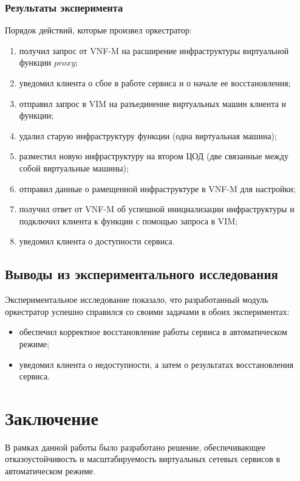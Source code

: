 \documentclass[oneside,final,14pt,a4paper]{extreport}
\begin{document}
\subsection{Результаты эксперимента}
Порядок действий, которые произвел оркестратор:
\begin{enumerate}
	\item получил запрос от VNF-M на расширение инфраструктуры виртуальной функции $proxy$;
	\item уведомил клиента о сбое в работе сервиса и о начале ее восстановления;
	\item отправил запрос в VIM на разъединение виртуальных машин клиента и функции;
	\item удалил старую инфраструктуру функции (одна виртуальная машина);
	\item разместил новую инфраструктуру на втором ЦОД (две связанные между собой виртуальные машины);
	\item отправил данные о рамещенной инфраструктуре в VNF-M для настройки;
	\item получил ответ от VNF-M об успешной инициализации инфраструктуры и подключил клиента к функции с помощью запроса в VIM;
	\item уведомил клиента о доступности сервиса.
\end{enumerate}


\section{Выводы из экспериментального исследования}
Экспериментальное исследование показало, что разработанный модуль оркестратор успешно справился со своими задачами в обоих экспериментах:
\begin{itemize}
	\item обеспечил корректное восстановление работы сервиса в автоматическом режиме;
	\item уведомил клиента о недоступности, а затем о результатах восстановления сервиса.
\end{itemize}





\chapter*{Заключение}
В рамках данной работы было разработано решение, обеспечивающее отказоустойчивость и масштабируемость виртуальных сетевых сервисов в автоматическом режиме.
\end{document}
